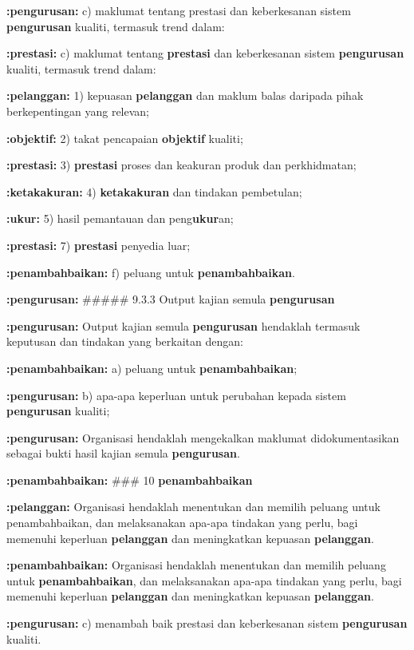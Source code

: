 \documentclass{article}
\begin{document}
\textbf{:pengurusan:} c) maklumat tentang prestasi dan keberkesanan sistem \textbf{pengurusan} kualiti, termasuk trend
dalam:

\textbf{:prestasi:} c) maklumat tentang \textbf{prestasi} dan keberkesanan sistem \textbf{pengurusan} kualiti, termasuk trend
dalam:

\textbf{:pelanggan:} 1) kepuasan \textbf{pelanggan} dan maklum balas daripada pihak berkepentingan yang
relevan;

\textbf{:objektif:} 2) takat pencapaian \textbf{objektif} kualiti;

\textbf{:prestasi:} 3) \textbf{prestasi} proses dan keakuran produk dan perkhidmatan;

\textbf{:ketakakuran:} 4) \textbf{ketakakuran} dan tindakan pembetulan;

\textbf{:ukur:} 5) hasil pemantauan dan peng\textbf{ukur}an;

\textbf{:prestasi:} 7) \textbf{prestasi} penyedia luar;

\textbf{:penambahbaikan:} f) peluang untuk \textbf{penambahbaikan}.

\textbf{:pengurusan:} \#\#\#\#\# 9.3.3 Output kajian semula \textbf{pengurusan}

\textbf{:pengurusan:} Output kajian semula \textbf{pengurusan} hendaklah termasuk keputusan dan tindakan yang
berkaitan dengan:

\textbf{:penambahbaikan:} a) peluang untuk \textbf{penambahbaikan};

\textbf{:pengurusan:} b) apa-apa keperluan untuk perubahan kepada sistem \textbf{pengurusan} kualiti;

\textbf{:pengurusan:} Organisasi hendaklah mengekalkan maklumat didokumentasikan sebagai bukti hasil kajian
semula \textbf{pengurusan}.

\textbf{:penambahbaikan:} \#\#\# 10 \textbf{penambahbaikan}

\textbf{:pelanggan:} Organisasi hendaklah menentukan dan memilih peluang untuk penambahbaikan, dan
melaksanakan apa-apa tindakan yang perlu, bagi memenuhi keperluan \textbf{pelanggan} dan
meningkatkan kepuasan \textbf{pelanggan}.

\textbf{:penambahbaikan:} Organisasi hendaklah menentukan dan memilih peluang untuk \textbf{penambahbaikan}, dan
melaksanakan apa-apa tindakan yang perlu, bagi memenuhi keperluan \textbf{pelanggan} dan
meningkatkan kepuasan \textbf{pelanggan}.

\textbf{:pengurusan:} c) menambah baik prestasi dan keberkesanan sistem \textbf{pengurusan} kualiti.
\end{document}
